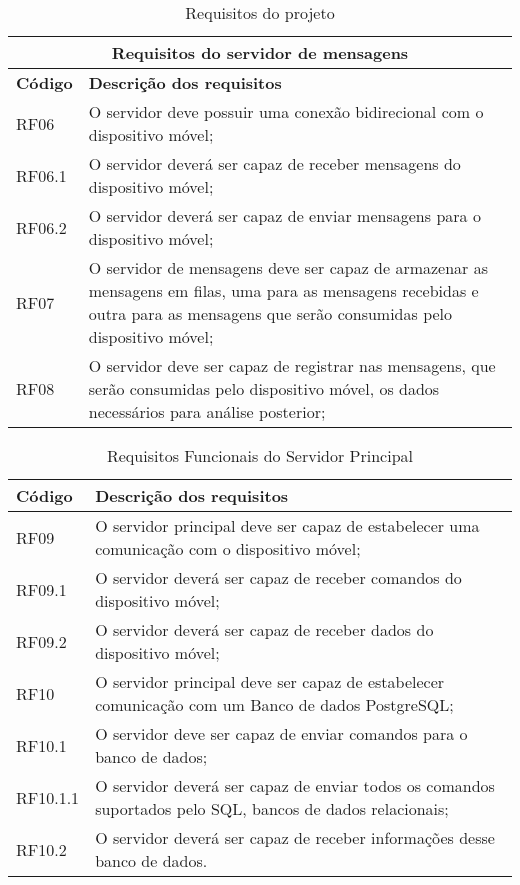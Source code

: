\begin{table}[htp]
\renewcommand{\arraystretch}{1.3}
\caption{Requisitos do projeto}
\label{descriçãoSA}
\centering
\begin{tabular}{|p{1.5cm}|p{11cm}|}
\hline
\multicolumn{2}{|c|}{Requisitos do servidor de mensagens} \\
\hline
\textbf{Código}  & \textbf{Descrição dos requisitos}\\\hline
RF06 & O servidor deve possuir uma conexão bidirecional com o dispositivo móvel; \\\hline
RF06.1 & O servidor deverá ser capaz de receber mensagens do dispositivo móvel; \\\hline
RF06.2 & O servidor deverá ser capaz de enviar mensagens para o dispositivo móvel; \\\hline
RF07 & O servidor de mensagens deve ser capaz de armazenar as mensagens em filas, uma para as mensagens recebidas e outra para as mensagens que serão consumidas pelo dispositivo móvel;  \\\hline
RF08 & O servidor deve ser capaz de registrar nas mensagens, que serão consumidas pelo dispositivo móvel, os dados necessários para análise posterior;\\\hline 
\end{tabular}
\end{table}

\begin{table}[htp]
\renewcommand{\arraystretch}{1.3}
\caption{Requisitos Funcionais do Servidor Principal}
\label{descriçãoSA}
\centering
\begin{tabular}{|p{1.5cm}|p{11cm}|}
\hline
\textbf{Código}  & \textbf{Descrição dos requisitos}\\\hline
RF09 & O  servidor principal deve ser capaz de estabelecer uma comunicação com o dispositivo móvel; \\\hline
RF09.1 & O servidor deverá ser capaz de receber comandos do dispositivo móvel; \\\hline
RF09.2 & O servidor deverá ser capaz de receber dados do dispositivo móvel; \\\hline
RF10 & O servidor principal deve ser capaz de estabelecer comunicação com um Banco de dados PostgreSQL;  \\\hline
RF10.1 & O servidor deve ser capaz de enviar comandos para o banco de dados; \\\hline
RF10.1.1 & O servidor deverá ser capaz de enviar todos os comandos suportados pelo SQL, bancos de dados relacionais;  \\\hline
RF10.2 & O servidor deverá ser capaz de receber informações desse banco de dados.
\end{tabular}
\end{table}

